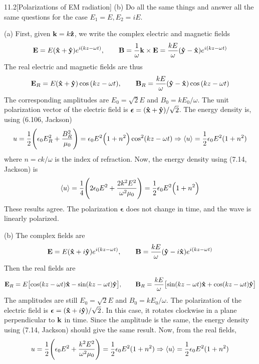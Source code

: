 \documentclass[12pt]{article}
\begin{document}
\begin{problem}{11.2}[Polarizations of EM radiation]
(b) Do all the same things and answer all the same questions for the case
$E_1=E,E_2=iE$.
\begin{solution}
(a) First, given $\vb{k}=k\vb{\hat{z}}$, we write the complex electric and magnetic
fields
\begin{equation}
    \vb{E}=E(\vb{\hat{x}}+\vb{\hat{y}})e^{i(kz-\omega t)},\qquad
    \vb{B}=\frac1\omega\vb{k}\times\vb{E}=\frac{kE}{\omega}\qty(\vb{\hat{y}}-\vb{\hat{x}})e^{i(kz-\omega
    t)}
\end{equation}
The real electric and magnetic fields are thus
\begin{equation}
    \vb{E}_R=E\qty(\vb{\hat{x}}+\vb{\hat{y}})\cos\qty(kz-\omega t),\qquad
    \vb{B}_R=\frac{kE}{\omega}\qty(\vb{\hat{y}}-\vb{\hat{x}})\cos\qty(kz-\omega t)
\end{equation}
The corresponding amplitudes are $E_0=\sqrt{2}E$ and $B_0=kE_0/\omega$. The unit
polarization vector of the electric field is $\bm\epsilon=(\vb{\hat{x}}+\vb{\hat{y}})/\sqrt2$.
The energy density is, using (6.106, Jackson)
\begin{equation}
    u=\frac12\qty(\epsilon_0E_R^2+\frac{B_R^2}{\mu_0})=\epsilon_0E^2\qty(1+n^2)\cos^2(kz-\omega
    t)\Rightarrow\expval{u}=\frac12\epsilon_0E^2(1+n^2) 
\end{equation}
where $n=ck/\omega$ is the index of refraction. Now, the energy density using
(7.14, Jackson) is
\begin{equation}
    \expval{u}=\frac14\qty(2\epsilon_0E^2+\frac{2k^2E^2}{\omega^2\mu_0}) 
    =\frac12\epsilon_0E^2\qty(1+n^2)
\end{equation}
These results agree. The polarization $\bm\epsilon$ does not change in time, and
the wave is linearly polarized.

(b) The complex fields are
\begin{equation}
    \vb{E}=E(\vb{\hat{x}}+i\vb{\hat{y}})e^{i(kz-\omega t)},\qquad
    \vb{B}=\frac{kE}{\omega}\qty(\vb{\hat{y}}-i\vb{\hat{x}})e^{i(kz-\omega t)}
\end{equation}
Then the real fields are
\begin{equation}
    \vb{E}_R=E\qty[\cos(kz-\omega t)\vb{\hat{x}}-\sin(kz-\omega t)\vb{\hat{y}}],\qquad
    \vb{B}_R=\frac{kE}{\omega}\qty[\sin(kz-\omega t)\vb{\hat{x}}+\cos(kz-\omega t)\vb{\hat{y}}]
\end{equation}
The amplitudes are still $E_0=\sqrt2E$ and $B_0=kE_0/\omega$. The polarization
of the electric field is $\bm\epsilon=(\vb{\hat{x}}+i\vb{\hat{y}})/\sqrt2$. In this case, it
rotates clockwise in a plane perpendicular to $\vb{k}$ in time. Since the
amplitude is the same, the energy density using (7.14, Jackson) should give the
same result. Now, from the real fields,
\begin{equation}
    u=\frac12\qty(\epsilon_0E^2+\frac{k^2E^2}{\omega^2\mu_0})
    =\frac12\epsilon_0E^2(1+n^2)\Rightarrow\expval{u}=\frac12\epsilon_0E^2(1+n^2)
\end{equation}
\end{solution}
\end{problem}
\end{document}
